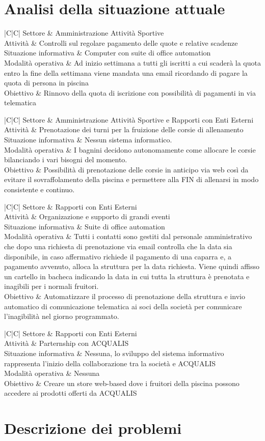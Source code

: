 \documentclass[11pt]{article} %
\newcommand{\AnalisiSituazioneAttualeTabella}[5]{
	\begin{tabulary}{\textwidth}{|C|C|}
		\hline
		Settore & #1 \\ \hline
		Attività & #2 \\ \hline
		Situazione informativa & #3 \\ \hline
		Modalità operativa & #4 \\ \hline
		Obiettivo & #5 \\
		\hline
	\end{tabulary}
}
\begin{document}
\section{Analisi della situazione attuale}

\AnalisiSituazioneAttualeTabella
	{Amministrazione Attività Sportive}
	{Controlli sul regolare pagamento delle quote e relative scadenze}
	{Computer con suite di office automation}
	{Ad inizio settimana a tutti gli iscritti a cui scaderà la quota entro la fine della settimana viene mandata una email ricordando di pagare la quota di persona in piscina}
	{Rinnovo della quota di iscrizione con possibilità di pagamenti in via telematica}

\AnalisiSituazioneAttualeTabella
	{Amministrazione Attività Sportive e Rapporti con Enti Esterni}
	{Prenotazione dei turni per la fruizione delle corsie di allenamento}
	{Nessun sistema informatico.}
	{I bagnini decidono autonomamente come allocare le corsie bilanciando i vari bisogni del momento.}
	{Possibilità di prenotazione delle corsie in anticipo via web così da evitare il sovraffolamento della piscina e permettere alla FIN di allenarsi in modo consistente e continuo.}

\AnalisiSituazioneAttualeTabella
	{Rapporti con Enti Esterni}
	{Organizazione e supporto di grandi eventi}
	{Suite di office automation}
	{Tutti i contatti sono gestiti dal personale amministrativo che dopo una richiesta di prenotazione via email controlla che la data sia disponibile, in caso affermativo richiede il pagamento di una caparra e, a pagamento avvenuto, alloca la struttura per la data richiesta. Viene quindi affisso un cartello in bacheca indicando la data in cui tutta la struttura è prenotata e inagibili per i normali fruitori.}
	{Automatizzare il processo di prenotazione della struttura e invio automatico di comunicazione telematica ai soci della società per comunicare l'inagibilità nel giorno programmato.}

\AnalisiSituazioneAttualeTabella
	{Rapporti con Enti Esterni}
	{Parternship con ACQUALIS}
	{Nessuna, lo sviluppo del sistema informativo rappresenta l'inizio della collaborazione tra la società e ACQUALIS}
	{Nessuna}
	{Creare un store web-based dove i fruitori della piscina possono accedere ai prodotti offerti da ACQUALIS}

\section{Descrizione dei problemi}
\end{document}
